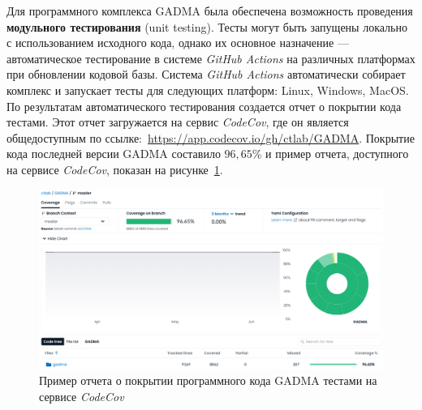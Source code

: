 Для программного комплекса GADMA была обеспечена возможность проведения \textbf{модульного тестирования} (unit testing).
Тесты могут быть запущены локально с использованием исходного кода, однако их основное назначение --- автоматическое тестирование в системе \textit{GitHub Actions} на различных платформах при обновлении кодовой базы.
Система \textit{GitHub Actions} автоматически собирает комплекс и запускает тесты для следующих платформ: Linux, Windows, MacOS.
По результатам автоматического тестирования создается отчет о покрытии кода тестами.
Этот отчет загружается на сервис \textit{CodeCov}, где он является общедоступным по ссылке:~\url{https://app.codecov.io/gh/ctlab/GADMA}.
Покрытие кода последней версии GADMA составило $96{,}65$\% и пример отчета, доступного на сервисе \textit{CodeCov}, показан на рисунке~\ref{fig:part5:codecov}.

\begin{figure}[ht]
    \centering
    \includegraphics[width=\linewidth]{images/part5/codecov_report.png}
    \caption{Пример отчета о покрытии программного кода GADMA тестами на сервисе \textit{CodeCov}}
    \label{fig:part5:codecov}
\end{figure}



